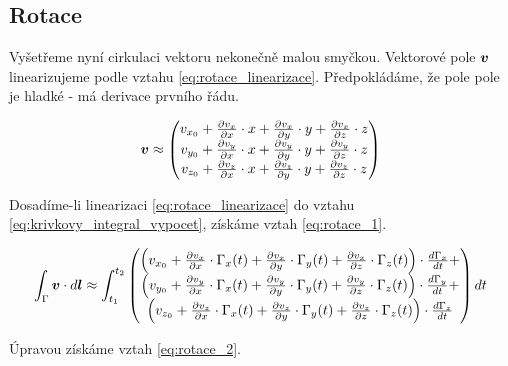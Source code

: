 \subsection{Rotace}
\label{sec:rotace}

Vyšetřeme nyní cirkulaci vektoru nekonečně malou smyčkou. Vektorové pole \(\boldsymbol{v}\) linearizujeme podle vztahu \eqref{eq:rotace_linearizace}.
Předpokládáme, že pole pole je hladké - má derivace prvního řádu.

\begin{equation}
\label{eq:rotace_linearizace}
\boldsymbol{v} \approx \begin{pmatrix}
v_{x_0} + \frac{\partial v_x}{\partial x} \cdot x + \frac{\partial v_x}{\partial y} \cdot y + \frac{\partial v_x}{\partial z} \cdot z \\
v_{y_0} + \frac{\partial v_y}{\partial x} \cdot x + \frac{\partial v_y}{\partial y} \cdot y + \frac{\partial v_y}{\partial z} \cdot z \\
v_{z_0} + \frac{\partial v_z}{\partial x} \cdot x + \frac{\partial v_z}{\partial y} \cdot y + \frac{\partial v_z}{\partial z} \cdot z
\end{pmatrix}
\end{equation}

Dosadíme-li linearizaci \eqref{eq:rotace_linearizace} do vztahu \eqref{eq:krivkovy_integral_vypocet}, získáme vztah \eqref{eq:rotace_1}.

\begin{equation}
\label{eq:rotace_1}
\int_\Gamma \boldsymbol{v} \cdot d\boldsymbol{l} \approx
\int_{t_1}^{t_2} \begin{pmatrix}
\left(v_{x_0} + \frac{\partial v_x}{\partial x} \cdot \Gamma_x(t) + \frac{\partial v_x}{\partial y} \cdot \Gamma_y(t) + \frac{\partial v_x}{\partial z} \cdot \Gamma_z(t)\right) \cdot \frac{d \Gamma_x}{dt} + \\
\left(v_{y_0} + \frac{\partial v_y}{\partial x} \cdot \Gamma_x(t) + \frac{\partial v_y}{\partial y} \cdot \Gamma_y(t) + \frac{\partial v_y}{\partial z} \cdot \Gamma_z(t)\right) \cdot \frac{d \Gamma_y}{dt} + \\
\left(v_{z_0} + \frac{\partial v_z}{\partial x} \cdot \Gamma_x(t) + \frac{\partial v_z}{\partial y} \cdot \Gamma_y(t) + \frac{\partial v_z}{\partial z} \cdot \Gamma_z(t)\right) \cdot \frac{d \Gamma_z}{dt}
\end{pmatrix} dt
\end{equation}

Úpravou získáme vztah \eqref{eq:rotace_2}.

